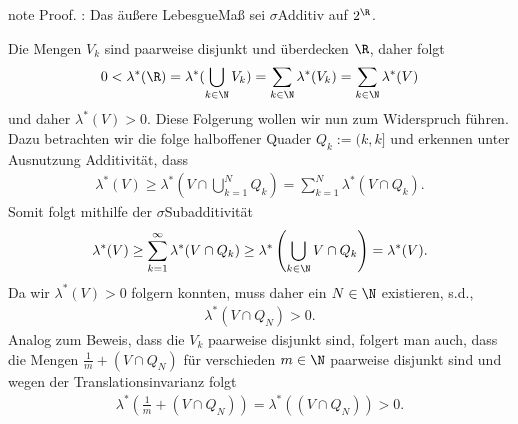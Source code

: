 \documentclass[letterpaper,10pt,english]{jupyterBook}
\begin{document}
\begin{sphinxadmonition}{note}
\sphinxAtStartPar
Proof. : Das äußere Lebesgue\sphinxhyphen{}Maß sei \(\sigma\)\sphinxhyphen{}Additiv auf \(2^{\R}\).

\sphinxAtStartPar
Die Mengen \(V_k\) sind paarweise disjunkt und überdecken \(\R\), daher folgt
\begin{equation*}
\begin{split}0<\lambda^\ast(\R) = \lambda^\ast(\bigcup_{k\in\N} V_k) = \sum_{k\in\N} \lambda^\ast(V_k) = \sum_{k\in\N} \lambda^\ast(V)\end{split}
\end{equation*}
\sphinxAtStartPar
und daher \(\lambda^\ast(V)>0\). Diese Folgerung wollen wir nun zum Widerspruch führen. Dazu betrachten wir die folge halboffener Quader \(Q_k:=(k,k]\) und erkennen unter Ausnutzung  Additivität, dass
\begin{equation*}
\begin{split}\lambda^\ast(V) \geq \lambda^\ast\left(V \cap \bigcup_{k=1}^N Q_k\right) = 
\sum_{k=1}^N \lambda^\ast(V\cap Q_k).\end{split}
\end{equation*}
\sphinxAtStartPar
Somit folgt mithilfe der \(\sigma\)\sphinxhyphen{}Subadditivität
\begin{equation*}
\begin{split}\lambda^\ast(V) \geq \sum_{k=1}^\infty \lambda^\ast(V\cap Q_k) \geq
\lambda^\ast\left(\bigcup_{k\in\N} V\cap Q_k\right) = \lambda^\ast(V).\end{split}
\end{equation*}
\sphinxAtStartPar
Da wir \(\lambda^\ast(V)>0\) folgern konnten, muss daher ein \(N\in\N\) existieren, s.d.,
\begin{equation*}
\begin{split}\lambda^\ast(V\cap Q_N) >0.\end{split}
\end{equation*}
\sphinxAtStartPar
Analog zum Beweis, dass die \(V_k\) paarweise disjunkt sind, folgert man auch, dass die Mengen \(\frac{1}{m}+(V\cap Q_N)\) für verschieden \(m\in\N\) paarweise disjunkt sind und wegen der Translationsinvarianz folgt
\begin{equation*}
\begin{split}\lambda^\ast(\frac{1}{m}+(V\cap Q_N)) = \lambda^\ast((V\cap Q_N)) >0.\end{split}
\end{equation*}
\sphinxAtStartPar

\end{sphinxadmonition}
\end{document}
